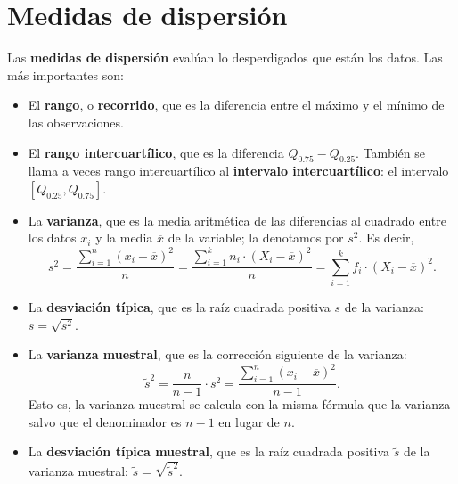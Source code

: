 \documentclass[
]{book}
\theoremstyle{definition}
\theoremstyle{definition}
\theoremstyle{definition}
\theoremstyle{remark}
\begin{document}
\hypertarget{medidas-de-dispersiuxf3n}{%
\section{Medidas de dispersión}\label{medidas-de-dispersiuxf3n}}

Las \textbf{medidas de dispersión} evalúan lo desperdigados que están los datos. Las más importantes son:

\begin{itemize}
\item
  El \textbf{rango}, o \textbf{recorrido}, que es la diferencia entre el máximo y el mínimo de las observaciones.
\item
  El \textbf{rango intercuartílico}, que es la diferencia \(Q_{0.75}-Q_{0.25}\). También se llama a veces rango intercuartílico al \textbf{intervalo intercuartílico}: el intervalo \([Q_{0.25},Q_{0.75}]\).
\item
  La \textbf{varianza}, que es la media aritmética de las diferencias al cuadrado entre los datos \(x_i\) y la media \(\overline{x}\) de la variable; la denotamos por \(s^2\). Es decir,
  \[
  s^2=\frac{\sum_{i=1}^n (x_i-\overline{x})^2}{n}=\frac{\sum_{i=1}^k n_i\cdot
  (X_i-\overline{x})^2}{n}=\sum_{i=1}^k f_i\cdot (X_i-\overline{x})^2.
  \]
\item
  La \textbf{desviación típica}, que es la raíz cuadrada positiva \(s\) de la varianza:
  \(s=\sqrt{s^2}\).
\item
  La \textbf{varianza muestral}, que es la corrección siguiente de la varianza:
  \[
  \tilde{s}^2 =\frac{n}{n-1} \cdot s^2=\frac{\sum_{i=1}^n (x_i-\overline{x})^2}{n-1}.
  \]
  Esto es, la varianza muestral se calcula con la misma fórmula que la varianza salvo que el denominador es \(n-1\) en lugar de \(n\).
\item
  La \textbf{desviación típica muestral}, que es la raíz cuadrada positiva \(\tilde{s}\) de la varianza muestral: \(\tilde{s}=\sqrt{\tilde{s}^2}\).
\end{itemize}
\end{document}
